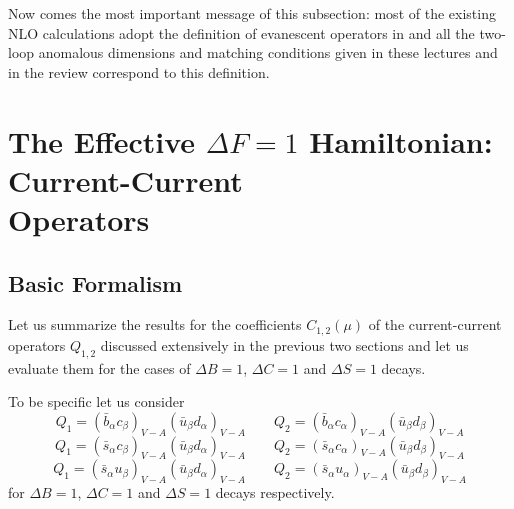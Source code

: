 \documentclass[12pt]{article}
\begin{document}
\begin{itemize}
\begin{itemize}
Now comes the most important message of this subsection: 
most of the existing NLO calculations adopt the definition of
evanescent operators in \cite{WEISZ} and all the two-loop
anomalous dimensions and matching conditions given in these
lectures and in the review \cite{BBL} correspond to this definition.

\section{The Effective $\Delta F=1$ Hamiltonian: 
        Current-Current \\ Operators}
   \label{sec:HeffdF1:22}
\setcounter{equation}{0}
\subsection{Basic Formalism}
Let us summarize the results for the coefficients $C_{1,2}(\mu)$ of
the current-current operators $Q_{1,2}$ discussed extensively in the
previous two sections and let us evaluate them for the cases of
$\Delta B=1$, $\Delta C=1$ and $\Delta S=1$ decays.

To be specific let us consider
\begin{equation}\label{B1}
Q_1=(\bar b_\alpha c_\beta)_{V-A} (\bar u_\beta d_\alpha)_{V-A}
\qquad 
Q_2=(\bar b_\alpha c_\alpha)_{V-A} (\bar u_\beta d_\beta)_{V-A}
\end{equation}
\begin{equation}\label{B2}
Q_1=(\bar s_\alpha c_\beta)_{V-A} (\bar u_\beta d_\alpha)_{V-A}
\qquad 
Q_2=(\bar s_\alpha c_\alpha)_{V-A} (\bar u_\beta d_\beta)_{V-A}
\end{equation}
\begin{equation}\label{B3}
Q_1=(\bar s_\alpha u_\beta)_{V-A} (\bar u_\beta d_\alpha)_{V-A}
\qquad 
Q_2=(\bar s_\alpha u_\alpha)_{V-A} (\bar u_\beta d_\beta)_{V-A}
\end{equation}
for $\Delta B=1$, $\Delta C=1$ and $\Delta S=1$ decays respectively.


\end{itemize}
\end{itemize}
\end{document}
